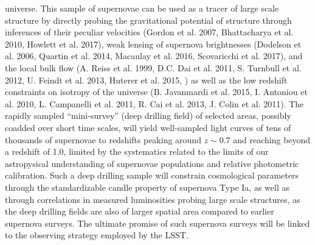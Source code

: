 \begin{itemize}
  universe. This sample of supernovae can be used as a tracer of large scale structure by directly probing the gravitational potential of structure through inferences of their peculiar velocities (Gordon et al. 2007, Bhattacharya et al. 2010, Howlett et al. 2017), weak lensing of supernova brightnesses (Dodelson et al. 2006, Quartin et al. 2014, Macaulay et al. 2016, Scovaricchi et al. 2017), and the local bulk flow (A. Reiss et al. 1999, D.C. Dai et al. 2011, S. Turnbull et al. 2012, U. Feindt et al. 2013,  Huterer et al. 2015, ) as well as the low redshift constraints on isotropy of the universe (B. Javanmardi et al. 2015, I. Antoniou et al. 2010, L. Campanelli et al. 2011, R. Cai et al. 2013, J. Colin et al. 2011).  The rapidly sampled ``mini-survey'' (deep drilling field) of selected areas, possibly coadded over short time scales,  will yield well-sampled light curves of tens of thousands of supernovae to redshifts peaking around $z\sim 0.7$ and reaching beyond a redshift of 1.0, limited by the systematics related to the limits of our astropysical understanding of supernovae populations and relative photometric calibration. Such a deep drilling sample will constrain cosmological parameters through the standardizable candle property of supernova Type Ia, as well as through correlations in measured luminosities probing large scale structures, as the deep drilling fields are also of larger spatial area compared to earlier supernova surveys. The ultimate promise of such supernova surveys will be linked to the observing strategy employed by the LSST.


\end{itemize}
